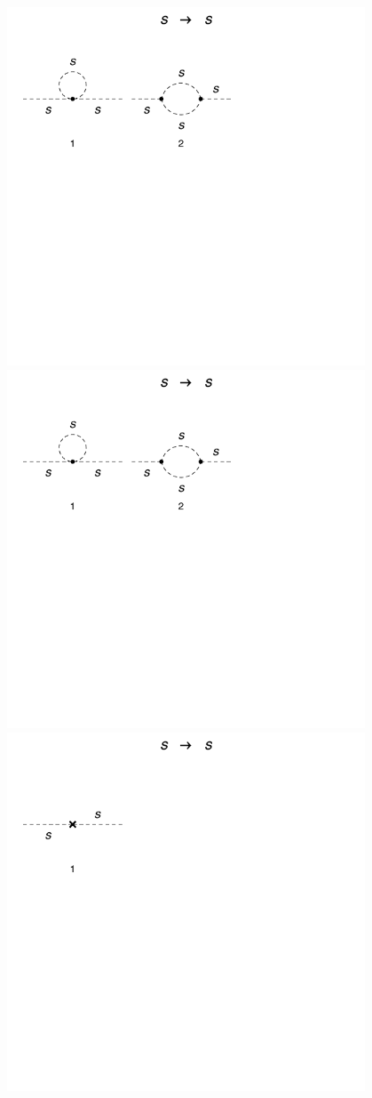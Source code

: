 \documentclass[11pt]{article}
\begin{document}
\noindent\begin{minipage}{0.3\textwidth}
\includegraphics[width=0.8\textwidth]{1loop_1.pdf}\\
\includegraphics[width=0.8\textwidth]{1loop_2.pdf}\\
\includegraphics[width=0.8\textwidth]{1loop_c.pdf}
\end{minipage}
\end{document}
